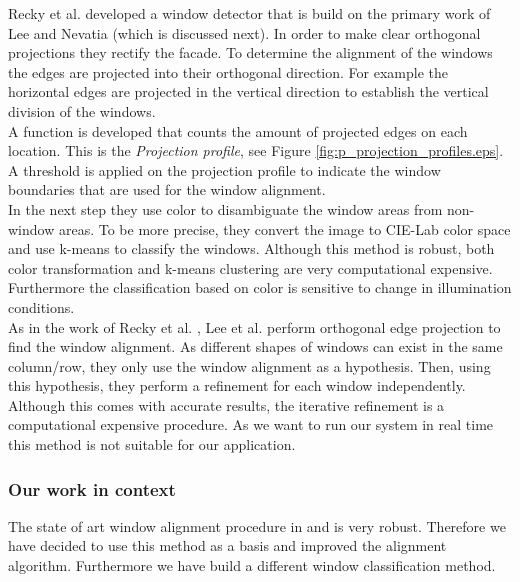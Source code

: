 Recky et al. \cite{Recky_kmeans} developed a window detector that is build on
the primary work of Lee and Nevatia \cite{Lee_extraction} (which is discussed
next).  In order to make clear orthogonal projections they rectify the facade. 
To determine the alignment of the windows the edges are projected into their orthogonal direction. 
For example the horizontal edges are projected in the vertical direction to 
establish the vertical division of the windows.\\
A function is developed that counts the amount of projected edges on each
location. This is the \emph{Projection profile}, see Figure
\ref{fig:p_projection_profiles.eps}.
A threshold is applied on the projection profile to indicate the window
boundaries that are used for the window alignment.\\

In the next step they use color to disambiguate the window areas from non-window
areas.  To be more precise, they convert the image to CIE-Lab color space and
use k-means to classify the windows.  Although this method is robust, both color
transformation and k-means clustering are very computational expensive.
Furthermore the classification based on color is sensitive to change in
illumination conditions.\\


As in the work of Recky et al. \cite{Recky_kmeans}, Lee et al.
\cite{Lee_extraction}
perform orthogonal edge projection to find the window alignment.  As different
shapes of windows can exist in the same column/row, they only use the window alignment as
a hypothesis.  Then, using this hypothesis, they perform a refinement for each
window independently. 
Although this comes with accurate results, the iterative refinement is
a computational expensive procedure. As we want to run our system in real time
this method is not suitable for our application. \\

\subsubsection{Our work in context}
The state of art window alignment procedure in \cite{Recky_kmeans} and \cite{Lee_extraction}
is very robust.  Therefore we have decided to use this method as a basis and improved
the alignment algorithm. Furthermore we have build a different window classification method.  


